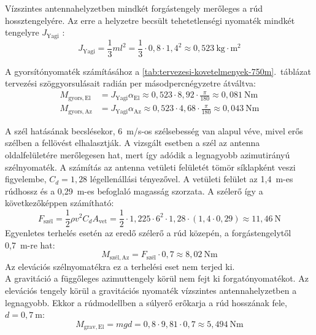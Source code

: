 Vízszintes antennahelyzetben mindkét forgástengely
merőleges a rúd hossztengelyére.
Az erre a helyzetre becsült tehetetlenségi nyomaték
mindkét tengelyre $J_{\mathrm{Yagi}}$
\cite{tehetetlensegi-nyom}:
\begin{equation}
    J_{\mathrm{Yagi}}=\frac{1}{3}ml^2=\frac{1}{3}\cdot0{,}8\cdot1{,}4^2\approx0{,}523~\mathrm{kg\cdot m^2}
\end{equation}

A gyorsítónyomaték számításához a
\ref{tab:tervezesi-kovetelmenyek-750m}.~táblázat tervezési
szöggyorsulásait radián per másodpercnégyzetre átváltva:
\begin{align}
    M_{\mathrm{gyors,El}} &= J_{\mathrm{Yagi}}\alpha_{\mathrm{El}} \approx 0{,}523\cdot 8{,}92\cdot\frac{\pi}{180}\approx 0{,}081~\mathrm{Nm} \\
    M_{\mathrm{gyors,Az}} &= J_{\mathrm{Yagi}}\alpha_{\mathrm{Az}} \approx 0{,}523\cdot 4{,}68\cdot\frac{\pi}{180}\approx 0{,}043~\mathrm{Nm}
\end{align}

A szél hatásának becslésekor, 6~m/s-os szélsebesség van alapul véve,
mivel erős szélben a fellövést elhalasztják. 
A vizsgált esetben a szél az antenna oldalfelületére merőlegesen hat,
mert így adódik a legnagyobb azimutirányú szélnyomaték.
A számítás az antenna vetületi felületét tömör síklapként
veszi figyelembe, $C_d=1{,}28$ légellenállási tényezővel.
A vetületi felület az 1,4~m-es rúdhossz és a 0,29~m-es
befoglaló magasság szorzata.
A szélerő így a következőképpen számítható:
\begin{equation}
    F_{\mathrm{szél}}
    = \frac{1}{2}\rho v^2C_d A_{\mathrm{vet}}
    = \frac{1}{2}\cdot1{,}225\cdot6^2\cdot1{,}28
      \cdot(1{,}4\cdot0{,}29)
    \approx 11{,}46~\mathrm{N}
\end{equation}
Egyenletes terhelés esetén az eredő szélerő a rúd
közepén, a forgástengelytől 0,7~m-re hat:
\begin{equation}
    M_{\mathrm{szél,Az}}
    = F_{\mathrm{szél}}\cdot0{,}7
    \approx 8{,}02~\mathrm{Nm}
\end{equation}
Az elevációs szélnyomatékra ez a terhelési eset nem terjed ki. \\

A gravitáció a függőleges azimuttengely körül nem fejt
ki forgatónyomatékot. Az elevációs tengely körül a
gravitációs nyomaték vízszintes antennahelyzetben a
legnagyobb. Ekkor a rúdmodellben a súlyerő erőkarja
a rúd hosszának fele, $d=0{,}7~\mathrm{m}$:
\begin{equation}
    M_{\mathrm{grav,El}}=mgd=0{,}8\cdot9{,}81\cdot0{,}7\approx5{,}494~\mathrm{Nm}
\end{equation}

